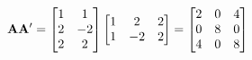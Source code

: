 \begin{enumerate}[label=(\alph*)]
            \[
                \bold{A}\bold{A}^\prime
                =
                \begin{bmatrix}
                    1 & 1 \\
                    2 & -2 \\
                    2 & 2
                \end{bmatrix}
                \begin{bmatrix}
                    1 & 2 & 2 \\
                    1 & -2 & 2
                \end{bmatrix}
                =
                \begin{bmatrix}
                    2 & 0 & 4 \\
                    0 & 8 & 0 \\
                    4 & 0 & 8
                \end{bmatrix}
            \]
            

\end{enumerate}
